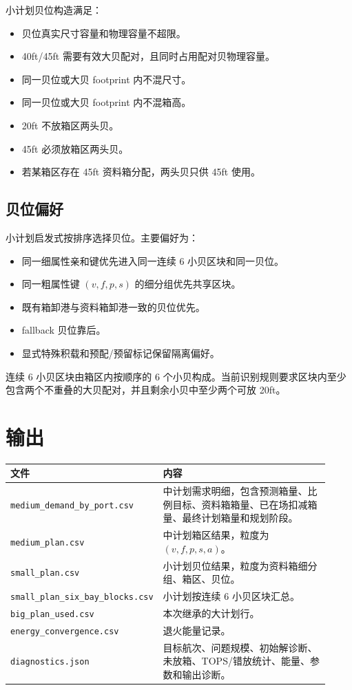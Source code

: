 \documentclass[UTF8,a4paper,11pt]{ctexart}
\newcommand{\code}[1]{\nolinkurl{#1}}
\begin{document}
小计划贝位构造满足：
\begin{itemize}
  \item 贝位真实尺寸容量和物理容量不超限。
  \item 40ft/45ft 需要有效大贝配对，且同时占用配对贝物理容量。
  \item 同一贝位或大贝 footprint 内不混尺寸。
  \item 同一贝位或大贝 footprint 内不混箱高。
  \item 20ft 不放箱区两头贝。
  \item 45ft 必须放箱区两头贝。
  \item 若某箱区存在 45ft 资料箱分配，两头贝只供 45ft 使用。
\end{itemize}

\subsection{贝位偏好}

小计划启发式按排序选择贝位。主要偏好为：
\begin{itemize}
  \item 同一细属性亲和键优先进入同一连续 6 小贝区块和同一贝位。
  \item 同一粗属性键 \((v,f,p,s)\) 的细分组优先共享区块。
  \item 既有箱卸港与资料箱卸港一致的贝位优先。
  \item fallback 贝位靠后。
  \item 显式特殊积载和预配/预留标记保留隔离偏好。
\end{itemize}

连续 6 小贝区块由箱区内按顺序的 6 个小贝构成。当前识别规则要求区块内至少包含两个不重叠的大贝配对，并且剩余小贝中至少两个可放 20ft。

\section{输出}

\begin{longtable}{L{0.34\linewidth}L{0.58\linewidth}}
\toprule
文件 & 内容\\
\midrule
\code{medium_demand_by_port.csv} & 中计划需求明细，包含预测箱量、比例目标、资料箱箱量、已在场扣减箱量、最终计划箱量和规划阶段。\\
\code{medium_plan.csv} & 中计划箱区结果，粒度为 \((v,f,p,s,a)\)。\\
\code{small_plan.csv} & 小计划贝位结果，粒度为资料箱细分组、箱区、贝位。\\
\code{small_plan_six_bay_blocks.csv} & 小计划按连续 6 小贝区块汇总。\\
\code{big_plan_used.csv} & 本次继承的大计划行。\\
\code{energy_convergence.csv} & 退火能量记录。\\
\code{diagnostics.json} & 目标航次、问题规模、初始解诊断、未放箱、TOPS/错放统计、能量、参数和输出诊断。\\
\bottomrule
\end{longtable}
\end{document}
